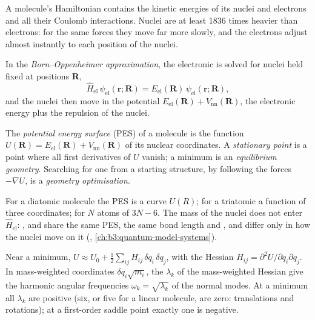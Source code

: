 A molecule's Hamiltonian contains the kinetic energies of its nuclei and
electrons and all their Coulomb interactions. Nuclei are at least 1836
times heavier than electrons: for the same forces they move far more
slowly, and the electrons adjust almost instantly to each position of the
nuclei.

\begin{definition}\label{def:b3:computational-chemistry:born-oppenheimer}
In the \emph{Born--Oppenheimer approximation}, the electronic  is solved for nuclei
held fixed at positions $\mathbf R$,
\[
\hat H_{\mathrm{el}}\,\psi_{\mathrm{el}}(\mathbf r;\mathbf R) =
E_{\mathrm{el}}(\mathbf R)\,\psi_{\mathrm{el}}(\mathbf r;\mathbf R),
\]
and the nuclei then move in the potential $E_{\mathrm{el}}(\mathbf R) +
V_{\mathrm{nn}}(\mathbf R)$, the electronic energy plus the repulsion of the
nuclei.
\end{definition}

\begin{definition}\label{def:b3:computational-chemistry:pes}
The \emph{potential energy surface} (PES) of
a molecule is the function $U(\mathbf R) = E_{\mathrm{el}}(\mathbf R) +
V_{\mathrm{nn}}(\mathbf R)$ of its nuclear coordinates. A \emph{stationary
point} is a point where all first derivatives of $U$
vanish; a minimum is an \emph{equilibrium geometry}. Searching for one from a starting structure, by following the
forces $-\nabla U$, is a \emph{geometry optimisation}.
\end{definition}

For a diatomic molecule the PES is a curve $U(R)$; for a triatomic a
function of three coordinates; for $N$ atoms of $3N - 6$. The mass of the
nuclei does not enter $\hat H_{\mathrm{el}}$: ,  and  share the
same PES, the same bond length and , and differ only in how
the nuclei move on it (, \cref{ch:b3:quantum-model-systems}).

\begin{proposition}\label{prop:b3:computational-chemistry:hessian}
Near a minimum, $U \approx U_0 + \frac12\sum_{ij}H_{ij}\,\delta q_i\,\delta q_j$, with
the Hessian $H_{ij} = \partial^2U/\partial q_i\partial q_j$. In mass-weighted
coordinates $\delta q_i\sqrt{m_i}$, the  $\lambda_k$ of the
mass-weighted Hessian give the harmonic angular frequencies $\omega_k =
\sqrt{\lambda_k}$ of the normal modes. At a minimum all $\lambda_k$ are
positive (six, or five for a linear molecule, are zero: translations and
rotations); at a first-order saddle point exactly one is negative.
\end{proposition}


